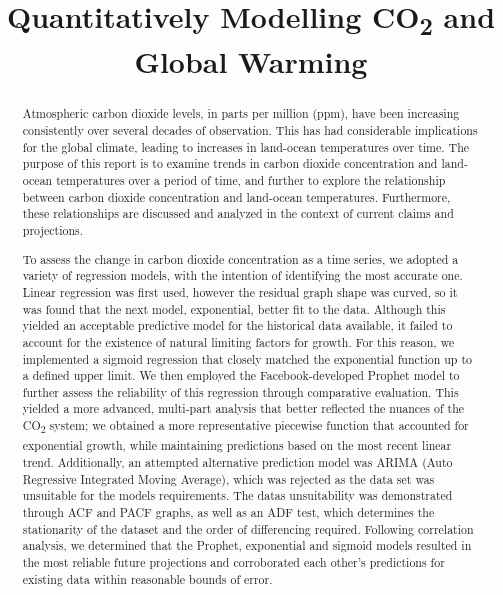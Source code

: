 \documentclass[12pt]{mcmthesis}
\begin{document}
    \graphicspath{ {./figs/} }

    \setlength{\abovedisplayskip}{3pt}
    \setlength{\belowdisplayskip}{3pt}
    \setlength{\abovedisplayshortskip}{-12pt}
    \setlength{\belowdisplayshortskip}{0pt}

    \setlength{\abovecaptionskip}{0pt}

    \title{Quantitatively Modelling CO\textsubscript{2} and Global Warming}


    \begin{abstract}
        Atmospheric carbon dioxide levels, in parts per million (ppm), have been increasing consistently over several decades of observation.
        This has had considerable implications for the global climate, leading to increases in land-ocean temperatures over time.
        The purpose of this report is to examine trends in carbon dioxide concentration and land-ocean temperatures over a period of time, and further to explore the relationship between carbon dioxide concentration and land-ocean temperatures.
        Furthermore, these relationships are discussed and analyzed in the context of current claims and projections.

        To assess the change in carbon dioxide concentration as a time series, we adopted a variety of regression models, with the intention of identifying the most accurate one. Linear regression was first used, however the residual graph shape was curved, so it was found that the next model, exponential, better fit to the data. Although this yielded an acceptable predictive model for the historical data available, it failed to account for the existence of natural limiting factors for growth. For this reason, we implemented a sigmoid regression that closely matched the exponential function up to a defined upper limit. We then employed the Facebook-developed Prophet model to further assess the reliability of this regression through comparative evaluation. This yielded a more advanced, multi-part analysis that better reflected the nuances of the CO\textsubscript{2} system; we obtained a more representative piecewise function that accounted for exponential growth, while maintaining predictions based on the most recent linear trend. Additionally, an attempted alternative prediction model was ARIMA (Auto Regressive Integrated Moving Average), which was rejected as the data set was unsuitable for the model\textquotesingle s requirements. The data\textquotesingle s unsuitability was demonstrated through ACF and PACF graphs, as well as an ADF test, which determines the stationarity of the dataset and the order of differencing required. Following correlation analysis, we determined that the Prophet, exponential and sigmoid models resulted in the most reliable future projections and corroborated each other’s predictions for existing data within reasonable bounds of error.


\end{abstract}
\end{document}
